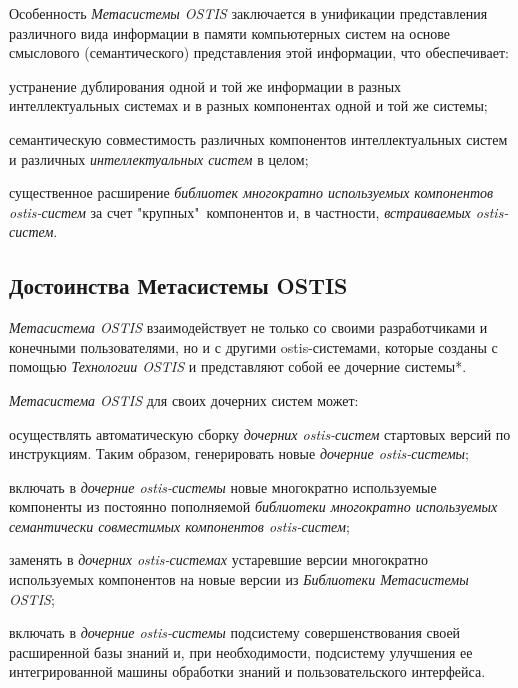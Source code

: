 Особенность \textit{Метасистемы OSTIS} заключается в унификации представления различного вида информации в памяти компьютерных систем на основе смыслового (семантического) представления этой информации, что обеспечивает:
	\begin{textitemize}
		\item устранение дублирования одной и той же информации в разных интеллектуальных системах и в разных компонентах одной и той же системы;
		\item семантическую совместимость различных компонентов интеллектуальных систем и различных \textit{интеллектуальных систем} в целом;
		\item существенное расширение \textit{библиотек многократно используемых компонентов ostis-систем} за счет "крупных"\ компонентов и, в частности, \textit{встраиваемых ostis-систем}.
	\end{textitemize}

\subsection{Достоинства Метасистемы OSTIS}
\label{ims_advantages}

\textit{Метасистема OSTIS} взаимодействует не только со своими разработчиками и конечными пользователями, но и с другими ostis-системами, которые созданы с помощью \textit{Технологии OSTIS} и представляют собой ее дочерние системы*. 

\textit{Метасистема OSTIS} для своих дочерних систем может:
\begin{textitemize}
	\item осуществлять автоматическую сборку \textit{дочерних ostis-систем} стартовых версий по инструкциям. Таким образом, генерировать новые \textit{дочерние ostis-системы};
	\item включать в \textit{дочерние ostis-системы} новые многократно используемые компоненты
	из постоянно пополняемой \textit{библиотеки многократно используемых семантически совместимых компонентов ostis-систем};
	\item заменять в \textit{дочерних ostis-системах} устаревшие версии многократно используемых компонентов на новые версии из \textit{Библиотеки Метасистемы OSTIS};
	\item включать в \textit{дочерние ostis-системы} подсистему совершенствования своей расширенной базы знаний и, при необходимости, подсистему улучшения ее интегрированной машины обработки знаний и пользовательского интерфейса.
\end{textitemize}

